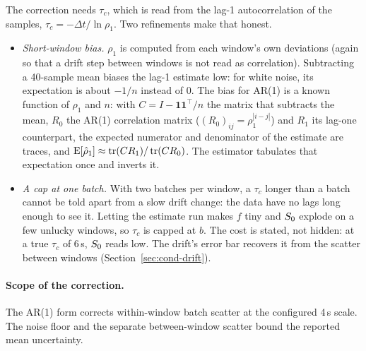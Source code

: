 The correction needs $\tau_c$, which is read from the lag-1 autocorrelation of the
samples, $\tau_c = -\Delta t/\ln\rho_1$. Two refinements make that honest.
\begin{itemize}[nosep]
  \item \emph{Short-window bias.} $\rho_1$ is computed from each window's own
        deviations (again so that a drift step between windows is not read as
        correlation). Subtracting a 40-sample mean biases the lag-1 estimate low:
        for white noise, its expectation is about $-1/n$ instead of $0$. The
        bias for AR(1) is a known function of $\rho_1$ and $n$: with
        $C = I - \bm 1\bm 1^\top/n$ the matrix that subtracts the mean, $R_0$ the
        AR(1) correlation matrix ($(R_0)_{ij} = \rho_1^{|i-j|}$) and $R_1$ its
        lag-one counterpart, the expected numerator and denominator of the
        estimate are traces, and
        $\operatorname{E}[\hat\rho_1]\approx\operatorname{tr}(CR_1)/\operatorname{tr}(CR_0)$.
        The estimator tabulates that expectation once and inverts it.
  \item \emph{A cap at one batch.} With two batches per window, a $\tau_c$
        longer than a batch cannot be told apart from a slow drift change: the
        data have no lags long enough to see it. Letting the estimate run makes
        $f$ tiny and $S_0$ explode on a few unlucky windows, so $\tau_c$ is
        capped at $b$. The cost is stated, not hidden: at a true $\tau_c$ of
        6\,s, $S_0$ reads low. The drift's error bar recovers it from the
        scatter between windows (Section~\ref{sec:cond-drift}).
\end{itemize}

\paragraph{Scope of the correction.} The AR(1) form corrects within-window
batch scatter at the configured 4\,s scale. The noise floor and the separate
between-window scatter bound the reported mean uncertainty.

